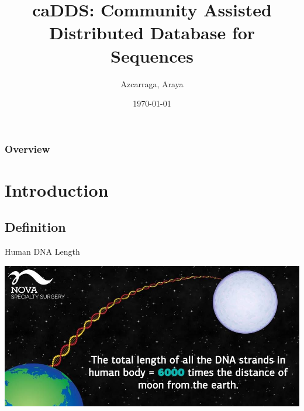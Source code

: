 \documentclass{beamer}
\title[Short title]{caDDS: Community Assisted Distributed Database for Sequences} %
\author{Azcarraga, Araya} %
\institute[Department of Computer Science, University of the Philippine - Diliman] %
{
University of the Philippine - Diliman\\ %
\medskip
}
\date{\today} %
\begin{document}
\begin{frame}
\frametitle{Overview} %
\tableofcontents %
\end{frame}



\section{Introduction}

    \subsection{Definition} %
    \begin{frame}{Human DNA Length}
    
        \centering
        \includegraphics[scale=0.3]{dna-length.jpg}
    \end{frame}
    
\end{document}
